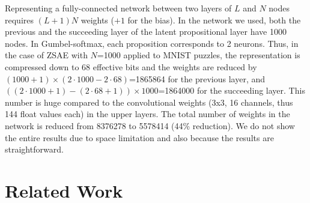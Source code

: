 Representing a fully-connected
network between two layers of $L$ and $N$ nodes requires $(L+1)N$
weights ($+1$ for the bias).
In the network we used,
both the previous and the succeeding layer of the latent propositional layer have 1000 nodes.
In Gumbel-softmax, each proposition corresponds to 2 neurons.
Thus, in the case of ZSAE with $N$=1000 applied to MNIST puzzles,
the representation is compressed down to 68 effective bits and
the weights are reduced by $(1000+1)\times (2\cdot 1000 - 2\cdot 68)$=1865864 for the previous layer,
and $((2\cdot 1000+1)-(2\cdot 68+1))\times 1000 $=1864000 for the succeeding layer.
This number is huge compared to the convolutional weights (3x3, 16 channels, thus 144 float values each) in the upper layers.
The total number of weights in the network is reduced from 8376278 to 5578414 (44\% reduction).
We do not show the entire results due to space limitation and also because the results are straightforward.


\section{Related Work}

